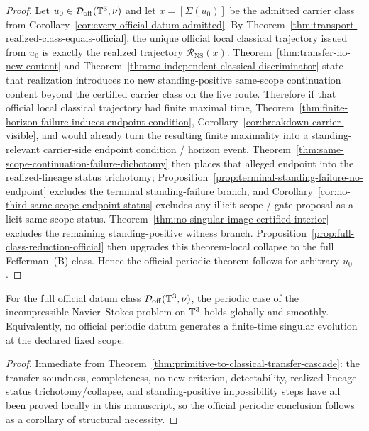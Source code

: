 \begin{proof}
Let $u_0\in\mathcal D_{\mathrm{off}}(\mathbb{T}^3,\nu)$ and let $x=[\Sigma(u_0)]$ be the admitted carrier class from Corollary~\ref{cor:every-official-datum-admitted}. By Theorem~\ref{thm:transport-realized-class-equals-official}, the unique official local classical trajectory issued from $u_0$ is exactly the realized trajectory $\mathcal R_{\mathrm{NS}}(x)$. Theorem~\ref{thm:transfer-no-new-content} and Theorem~\ref{thm:no-independent-classical-discriminator} state that realization introduces no new standing-positive same-scope continuation content beyond the certified carrier class on the live route. Therefore if that official local classical trajectory had finite maximal time, Theorem~\ref{thm:finite-horizon-failure-induces-endpoint-condition}, Corollary~\ref{cor:breakdown-carrier-visible}, and \HorizonDetectabilityRef{} would already turn the resulting finite maximality into a standing-relevant carrier-side endpoint condition / horizon event. Theorem~\ref{thm:same-scope-continuation-failure-dichotomy} then places that alleged endpoint into the realized-lineage status trichotomy; Proposition~\ref{prop:terminal-standing-failure-no-endpoint} excludes the terminal standing-failure branch, and Corollary~\ref{cor:no-third-same-scope-endpoint-status} excludes any illicit scope / gate proposal as a licit same-scope status. Theorem~\ref{thm:no-singular-image-certified-interior} excludes the remaining standing-positive witness branch. Proposition~\ref{prop:full-class-reduction-official} then upgrades this theorem-local collapse to the full Fefferman~(B) class. Hence the official periodic theorem follows for arbitrary $u_0$.
\end{proof}

\begin{manualcorollary}
\label{cor:official-periodic-structural-corollary}
For the full official datum class $\mathcal D_{\mathrm{off}}(\mathbb{T}^3,\nu)$, the periodic case of the incompressible Navier--Stokes problem on $\mathbb{T}^3$ holds globally and smoothly. Equivalently, no official periodic datum generates a finite-time singular evolution at the declared fixed scope.
\end{manualcorollary}

\begin{proof}
Immediate from Theorem~\ref{thm:primitive-to-classical-transfer-cascade}: the transfer soundness, completeness, no-new-criterion, detectability, realized-lineage status trichotomy/collapse, and standing-positive impossibility steps have all been proved locally in this manuscript, so the official periodic conclusion follows as a corollary of structural necessity.
\end{proof}

